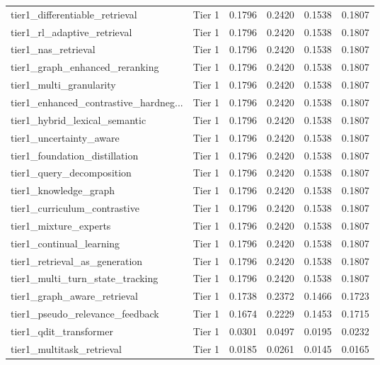 \begin{longtable}{lccccc}
tier1\_differentiable\_retrieval & Tier 1 & 0.1796 & 0.2420 & 0.1538 & 0.1807 \\
tier1\_rl\_adaptive\_retrieval & Tier 1 & 0.1796 & 0.2420 & 0.1538 & 0.1807 \\
tier1\_nas\_retrieval & Tier 1 & 0.1796 & 0.2420 & 0.1538 & 0.1807 \\
tier1\_graph\_enhanced\_reranking & Tier 1 & 0.1796 & 0.2420 & 0.1538 & 0.1807 \\
tier1\_multi\_granularity & Tier 1 & 0.1796 & 0.2420 & 0.1538 & 0.1807 \\
tier1\_enhanced\_contrastive\_hardneg... & Tier 1 & 0.1796 & 0.2420 & 0.1538 & 0.1807 \\
tier1\_hybrid\_lexical\_semantic & Tier 1 & 0.1796 & 0.2420 & 0.1538 & 0.1807 \\
tier1\_uncertainty\_aware & Tier 1 & 0.1796 & 0.2420 & 0.1538 & 0.1807 \\
tier1\_foundation\_distillation & Tier 1 & 0.1796 & 0.2420 & 0.1538 & 0.1807 \\
tier1\_query\_decomposition & Tier 1 & 0.1796 & 0.2420 & 0.1538 & 0.1807 \\
tier1\_knowledge\_graph & Tier 1 & 0.1796 & 0.2420 & 0.1538 & 0.1807 \\
tier1\_curriculum\_contrastive & Tier 1 & 0.1796 & 0.2420 & 0.1538 & 0.1807 \\
tier1\_mixture\_experts & Tier 1 & 0.1796 & 0.2420 & 0.1538 & 0.1807 \\
tier1\_continual\_learning & Tier 1 & 0.1796 & 0.2420 & 0.1538 & 0.1807 \\
tier1\_retrieval\_as\_generation & Tier 1 & 0.1796 & 0.2420 & 0.1538 & 0.1807 \\
tier1\_multi\_turn\_state\_tracking & Tier 1 & 0.1796 & 0.2420 & 0.1538 & 0.1807 \\
tier1\_graph\_aware\_retrieval & Tier 1 & 0.1738 & 0.2372 & 0.1466 & 0.1723 \\
tier1\_pseudo\_relevance\_feedback & Tier 1 & 0.1674 & 0.2229 & 0.1453 & 0.1715 \\
tier1\_qdit\_transformer & Tier 1 & 0.0301 & 0.0497 & 0.0195 & 0.0232 \\
tier1\_multitask\_retrieval & Tier 1 & 0.0185 & 0.0261 & 0.0145 & 0.0165 \\
\end{longtable}